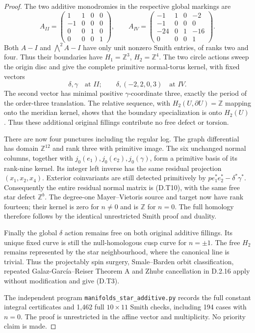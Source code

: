 \begin{proof}
The two additive monodromies in the respective global
markings are
\[
 A_{II}=\begin{pmatrix}
 1&1&0&0\\-1&0&0&0\\0&0&1&0\\0&0&0&1
 \end{pmatrix},\qquad
 A_{IV}=\begin{pmatrix}
 -1&1&0&-2\\-1&0&0&0\\-24&0&1&-16\\0&0&0&1
 \end{pmatrix}.
\]
Both $A-I$ and $\bigwedge^2A-I$ have only unit nonzero
Smith entries, of ranks two and four. Thus their boundaries
have $H_1=\mathbb Z^3$, $H_2=\mathbb Z^4$. The two circle
actions sweep the origin disc and give the complete
primitive normal-torus kernel, with fixed vectors
\[
 \delta,\gamma\quad\text{at }II;\qquad
 \delta,(-2,2,0,3)\quad\text{at }IV.
\]
The second vector has minimal positive $\gamma$-coordinate
three, exactly the period of the order-three translation.
The relative sequence, with $H_2(U,\partial U)=\mathbb Z$
mapping onto the meridian kernel, shows that the boundary
specialization is onto $H_2(U)$. Thus these additional
original fillings contribute no free defect or torsion.

There are now four punctures including the regular log.
The graph differential has domain $\mathbb Z^{12}$ and
rank three with primitive image. The six unchanged normal
columns, together with $j_0(e_1),j_0(e_2),j_0(\gamma)$,
form a primitive basis of its rank-nine kernel. Its integer
left inverse has the same residual projection
$(x_1,x_2,x_4)$. Exterior coinvariants are still detected
primitively by $p e_1^*e_2^*-\delta^*\gamma^*$.
Consequently the entire residual normal matrix is (D.T10),
with the same free star defect $\mathbb Z^b$.
The degree-one Mayer--Vietoris source and target now have
rank fourteen; their kernel is zero for $n\ne0$ and is
$\mathbb Z$ for $n=0$. The full homology therefore follows
by the identical unrestricted Smith proof and duality.

Finally the global $\delta$ action remains free on both
original additive fillings. Its unique fixed curve is
still the null-homologous cusp curve for $n=\pm1$.
The free $H_2$ remains represented by the star neighbourhood,
where the canonical line is trivial. Thus the projectably
spin surgery, Smale--Barden orbit classification, repeated
Galaz-Garc\'ia--Reiser Theorem A and Zhubr cancellation in
D.2.16 apply without modification and give (D.T3).

The independent program
\texttt{manifolds\_star\_additive.py} records the full
constant integral certificates and 1,462 full $10\times11$
Smith checks, including 194 cases with $n=0$. The proof is
unrestricted in the affine vector and multiplicity. No
priority claim is made.
\end{proof}

